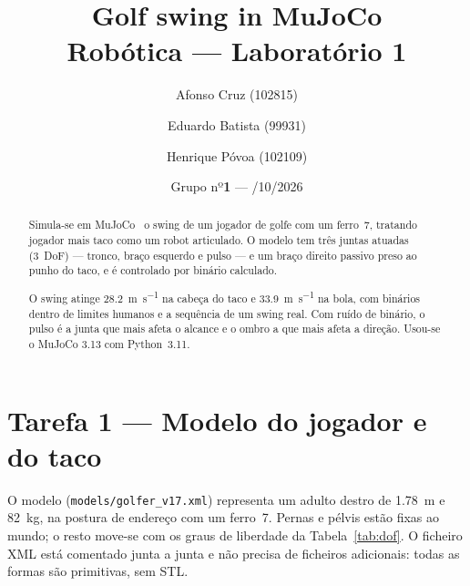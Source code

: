 \documentclass[11pt,a4paper]{article}
\title{{\color{verde}\textbf{Golf swing in MuJoCo}}\\[2mm]
       {\large\color{azul} Robótica --- Laboratório 1}}
\author{{Afonso Cruz (102815)} \and {Eduardo Batista (99931)} \and {Henrique Póvoa (102109)}}
\date{Grupo {nº\textbf{1}} \quad --- \quad 9/10/2026}
\begin{document}
\maketitle

\begin{abstract}
\begin{caixaresumo}
Simula-se em MuJoCo~\cite{todorov2012} o swing de um jogador de golfe com um
ferro~7, tratando jogador mais taco como um robot articulado. O modelo tem três
juntas atuadas (3~DoF) --- tronco, braço esquerdo e pulso --- e um braço
direito passivo preso ao punho do taco, e é controlado por binário calculado.

O swing atinge \SI{28.2}{\meter\per\second} na cabeça do taco e
\SI{33.9}{\meter\per\second} na bola, com binários dentro de limites humanos e
a sequência de um swing real. Com ruído de binário, o pulso é a junta que mais
afeta o alcance e o ombro a que mais afeta a direção. Usou-se o MuJoCo 3.13
com Python~3.11.
\end{caixaresumo}
\end{abstract}


\section{Tarefa 1 --- Modelo do jogador e do taco}

O modelo (\texttt{models/golfer\_v17.xml}) representa um adulto destro de
\SI{1.78}{\meter} e \SI{82}{\kilo\gram}, na postura de endereço com um ferro~7.
Pernas e pélvis estão fixas ao mundo; o resto move-se com os graus de liberdade
da Tabela~\ref{tab:dof}. O ficheiro XML está comentado junta a junta e não
precisa de ficheiros adicionais: todas as formas são primitivas, sem STL.
\end{document}
